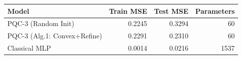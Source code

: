 \begin{tabular}{lrrr}
\toprule
Model & Train MSE & Test MSE & Parameters \\
\midrule
PQC-3 (Random Init) & 0.2245 & 0.3294 & 60 \\
PQC-3 (Alg.1: Convex+Refine) & 0.2291 & 0.2310 & 60 \\
Classical MLP & 0.0014 & 0.0216 & 1537 \\
\bottomrule
\end{tabular}
